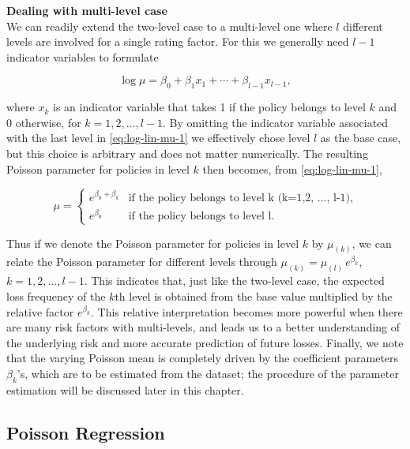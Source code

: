 \documentclass[]{book}
\theoremstyle{definition}
\theoremstyle{definition}
\theoremstyle{definition}
\theoremstyle{remark}
\begin{document}
\textbf{Dealing with multi-level case}\\
We can readily extend the two-level case to a multi-level one where
\(l\) different levels are involved for a single rating factor. For this
we generally need \(l-1\) indicator variables to formulate

\begin{equation}
\log \mu=\beta_0+\beta_1 x_1+\cdots+\beta_{l-1} x_{l-1},
\label{eq:log-lin-mu-1}
\end{equation}

where \(x_k\) is an indicator variable that takes 1 if the policy
belongs to level \(k\) and 0 otherwise, for \(k=1,2, \ldots, l-1\). By
omitting the indicator variable associated with the last level in
\eqref{eq:log-lin-mu-1} we effectively chose level \(l\) as the base case,
but this choice is arbitrary and does not matter numerically. The
resulting Poisson parameter for policies in level \(k\) then becomes,
from \eqref{eq:log-lin-mu-1},

\begin{equation}
\nonumber
\mu= \begin{cases}
     e^{\beta_0+\beta_k} & \text{if the policy belongs to level k (k=1,2, ..., l-1)}, \\
     e^{\beta_0} & \text{if the policy belongs to level l}.
\end{cases}
\end{equation}

Thus if we denote the Poisson parameter for policies in level \(k\) by
\(\mu_{(k)}\), we can relate the Poisson parameter for different levels
through \(\mu_{(k)}=\mu_{(l)}\, e^{\beta_k}\), \(k=1,2, \ldots, l-1\).
This indicates that, just like the two-level case, the expected loss
frequency of the \(k\)th level is obtained from the base value
multiplied by the relative factor \(e^{\beta_k}\). This relative
interpretation becomes more powerful when there are many risk factors
with multi-levels, and leads us to a better understanding of the
underlying risk and more accurate prediction of future losses. Finally,
we note that the varying Poisson mean is completely driven by the
coefficient parameters \(\beta_k\)'s, which are to be estimated from the
dataset; the procedure of the parameter estimation will be discussed
later in this chapter.

\subsection{Poisson Regression}\label{poisson-regression}
\end{document}
